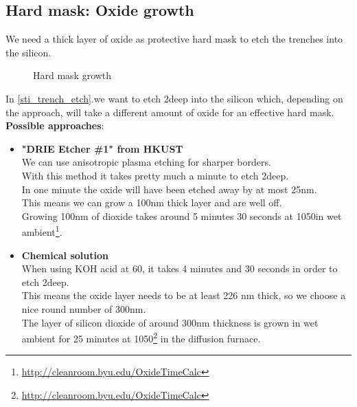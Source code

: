 \newpage

\subsection{Hard mask: Oxide growth}
We need a thick layer of oxide as protective hard mask to etch the trenches into the silicon.

\begin{figure}[H]
	\centering
	\begin{tikzpicture}[node distance = 3cm, auto, thick,scale=\CrossSectionOnly, every node/.style={transform shape}]
		
	\end{tikzpicture}
	\drawStepArrow{}
	\begin{tikzpicture}[node distance = 3cm, auto, thick,scale=\CrossSectionOnly, every node/.style={transform shape}]
		
	\end{tikzpicture}
	\caption{Hard mask growth}
\end{figure}

In \autoref{sti_trench_etch}.we want to etch 2\um deep into the silicon which, depending on the approach, will take a different amount of oxide for an effective hard mask. \\

\textbf{Possible approaches}:
\begin{itemize}
	\item \textbf{"DRIE Etcher \#1" from HKUST} \\
	We can use anisotropic plasma etching for sharper borders. \\
	With this method it takes pretty much a minute to etch 2\um deep. \\
	In one minute the oxide will have been etched away by at most 25nm. \\
	This means we can grow a 100nm thick layer and are well off. \\
	Growing 100nm of dioxide takes around 5 minutes 30 seconds at 1050\degreesC in wet ambient\footnote{\url{http://cleanroom.byu.edu/OxideTimeCalc}}.
	\item \textbf{Chemical solution} \\
	When using KOH acid at 60\degreesC,  it takes 4 minutes and 30 seconds in order to etch 2\um deep. \\
	This means the oxide layer needs to be at least 226 nm thick, so we choose a nice round number of 300nm. \\
	The layer of silicon dioxide of around 300nm thickness is grown in wet ambient for 25 minutes at 1050\degreesC\footnote{\url{http://cleanroom.byu.edu/OxideTimeCalc}} in the diffusion furnace.
\end{itemize}

